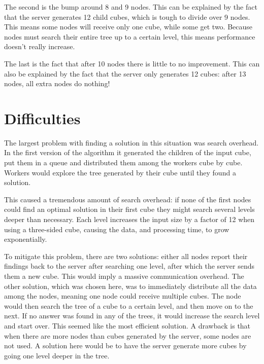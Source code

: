\documentclass[a4paper,11pt]{article}
\begin{document}
The second is the bump around 8 and 9 nodes. This can be explained by the fact that the server generates 12 child cubes, which is tough to divide over 9 nodes. This means some nodes will receive only one cube, while some get two. Because nodes must search their entire tree up to a certain level, this means performance doesn't really increase. 

The last is the fact that after 10 nodes there is little to no improvement. This can also be explained by the fact that the server only generates 12 cubes: after 13 nodes, all extra nodes do nothing!


\section{Difficulties}

The largest problem with finding a solution in this situation was search overhead. In the first version of the algorithm it generated the children of the input cube, put them in a queue and distributed them among the workers cube by cube. Workers would explore the tree generated by their cube until they found a solution. 

This caused a tremendous amount of search overhead: if none of the first nodes could find an optimal solution in their first cube they might search several levels deeper than necessary. Each level increases the input size by a factor of 12 when using a three-sided cube, causing the data, and processing time, to grow exponentially. 

To mitigate this problem, there are two solutions: either all nodes report their findings back to the server after searching one level, after which the server sends them a new cube. This would imply a massive communication overhead. The other solution, which was chosen here, was to immediately distribute all the data among the nodes, meaning one node could receive multiple cubes. The node would then search the tree of a cube to a certain level, and then move on to the next. If no answer was found in any of the trees, it would increase the search level and start over. This seemed like the most efficient solution. A drawback is that when there are more nodes than cubes generated by the server, some nodes are not used. A solution here would be to have the server generate more cubes by going one level deeper in the tree. 
\end{document}
